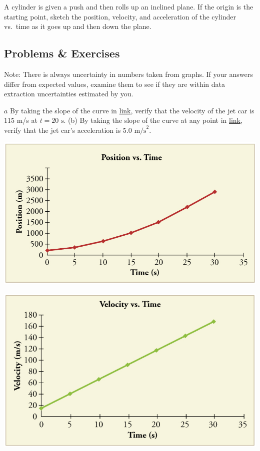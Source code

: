 \documentclass[
]{book}
\begin{document}
\hypertarget{fs-id2576953}{}
\leavevmode{}%
A cylinder is given a push and then rolls up an inclined plane. If the
origin is the starting point, sketch the position, velocity, and
acceleration of the cylinder vs.~time as it goes up and then down the
plane.

\hypertarget{fs-id1987308}{}
\hypertarget{problems-exercises-5}{%
\subsection{Problems \& Exercises}\label{problems-exercises-5}}

Note: There is always uncertainty in numbers taken from graphs. If your
answers differ from expected values, examine them to see if they are
within data extraction uncertainties estimated by you.

\hypertarget{fs-id4088406}{}
\leavevmode{}%
\(a\) By taking the slope of the curve in
\protect\hyperlink{import-auto-id1798398}{link}, verify that the
velocity of the jet car is 115 m/s at \({t = \text{20\ s}}{}\). (b) By
taking the slope of the curve at any point in
\protect\hyperlink{import-auto-id4101417}{link}, verify that the
jet car's acceleration is \({5\text{.}\text{0\ m/s}^{2}}{}\).

\includegraphics{images/Figure_02_08Sol_11.jpg}

\includegraphics{images/Figure_02_08Sol_12.jpg}
\end{document}
